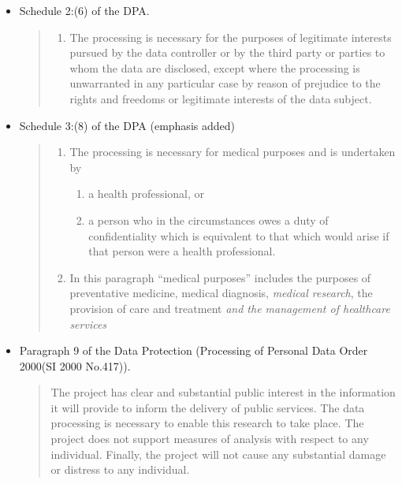\documentclass[]{article}
\begin{document}
\begin{itemize}[noitemsep]
\item Schedule 2:(6) of the DPA.
\begin{quotation} \begin{enumerate} \item The processing is necessary for the purposes of legitimate interests pursued by the data controller or by the third party or parties to whom the data are disclosed, except where the processing is unwarranted in any particular case by reason of prejudice to the rights and freedoms or legitimate interests of the data subject.\end{enumerate} \end{quotation}

\item Schedule 3:(8) of the DPA (emphasis added)
\begin{quotation} \begin{enumerate}
\item The processing is necessary for medical purposes and is undertaken by 
\begin{enumerate}
\item a health professional, or 
\item a person who in the circumstances owes a duty of confidentiality which is equivalent to that which would arise if that person were a health professional.
\end{enumerate}
\item In this paragraph “medical purposes” includes the purposes of preventative medicine, medical diagnosis, \emph{medical research}, the provision of care and treatment \emph{and the management of healthcare services}
\end{enumerate}\end{quotation}

\item Paragraph 9 of the Data Protection (Processing of Personal Data Order 2000(SI 2000 No.417)).
\begin{quotation} The project has clear and substantial public interest in the information it will provide to inform the delivery of public services. The data processing is necessary to enable this research to take place. The project does not support measures of analysis with respect to any individual. Finally, the project will not cause any substantial damage or distress to any individual. \end{quotation}

\end{itemize}
\end{document}
